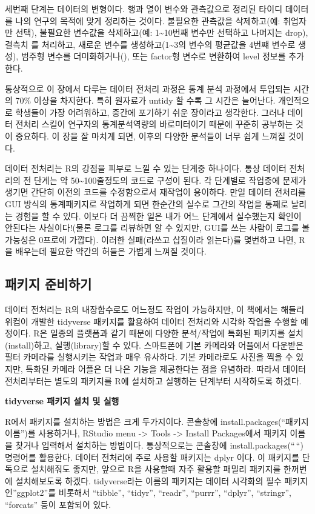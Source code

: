 \documentclass[
]{book}
\begin{document}
세번째 단계는 데이터의 변형이다. 행과 열이 변수와 관측값으로 정리된 타이디 데이터를 나의 연구의 목적에 맞게 정리하는 것이다. 불필요한 관측값을 삭제하고(예: 취업자만 선택), 불필요한 변수값을 삭제하고(예: 1\textasciitilde10번째 변수만 선택하고 나머지는 drop), 결측치 를 처리하고, 새로운 변수를 생성하고(1\textasciitilde3의 변수의 평균값을 4번쨰 변수로 생성), 범주형 변수를 더미화하거나(), 또는 factor형 변수로 변환하여 level 정보를 추가한다.

통상적으로 이 장에서 다루는 데이터 전처리 과정은 통계 분석 과정에서 투입되는 시간의 70\% 이상을 차지한다. 특히 원자료가 untidy 할 수록 그 시간은 늘어난다. 개인적으로 학생들이 가장 어려워하고, 중간에 포기하기 쉬운 장이라고 생각한다. 그러나 데이터 전처리 스킬이 연구자의 통계분석역량의 바로미터이기 때문에 꾸준히 공부하는 것이 중요하다. 이 장을 잘 마치게 되면, 이후의 다양한 분석들이 너무 쉽게 느껴질 것이다.

데이터 전처리는 R의 강점을 피부로 느낄 수 있는 단계중 하나이다. 통상 데이터 전처리의 전 단계는 약 50\textasciitilde100줄정도의 코드로 구성이 된다. 각 단계별로 작업중에 문제가 생기면 간단히 이전의 코드를 수정함으로서 재작업이 용이하다.
만일 데이터 전처리를 GUI 방식의 통계패키지로 작업하게 되면 한순간의 실수로 그간의 작업을 통째로 날리는 경험을 할 수 있다. 이보다 더 끔찍한 일은 내가 어느 단계에서 실수했는지 확인이 안된다는 사실이다!(물론 로그를 리뷰하면 알 수 있지만, GUI를 쓰는 사람이 로그를 볼 가능성은 0프로에 가깝다). 이러한 실패(라쓰고 삽질이라 읽는다)를 몇번하고 나면, R을 배우는데 필요한 약간의 허들은 가볍게 느껴질 것이다.

\subsection{패키지 준비하기}\label{uxd328uxd0a4uxc9c0-uxc900uxbe44uxd558uxae30}

데이터 전처리는 R의 내장함수로도 어느정도 작업이 가능하지만, 이 책에서는 해들리 위컴이 개발한 tidyverse 패키지를 활용하여 데이터 전처리와 시각화 작업을 수행할 예정이다.
R은 일종의 플랫폼과 같기 때문에 다양한 분석/작업에 특화된 패키지를 설치(install)하고, 실행(library)할 수 있다. 스마트폰에 기본 카메라와 어플에서 다운받은 필터 카메라를 실행시키는 작업과 매우 유사하다. 기본 카메라로도 사진을 찍을 수 있지만, 특화된 카메라 어플은 더 나은 기능을 제공한다는 점을 유념하라. 따라서 데이터 전처리부터는 별도의 패키지를 R에 설치하고 실행하는 단계부터 시작하도록 하겠다.

\textbf{tidyverse 패키지 설치 및 실행}

R에서 패키지를 설치하는 방법은 크게 두가지이다. 콘솔창에 install.packages(``패키지 이름'')를 사용하거나, RStudio menu -\textgreater{} Tools -\textgreater{} Install Packages에서 패키지 이름을 찾거나 입력해서 설치하는 방법이다. 통상적으로는 콘솔창에 install.packages(``\,``) 명령어를 활용한다.
데이터 전처리에 주로 사용할 패키지는 dplyr 이다. 이 패키지를 단독으로 설치해줘도 좋지만, 앞으로 R을 사용할때 자주 활용할 패밀리 패키지를 한꺼번에 설치해보도록 하겠다. tidyverse라는 이름의 패키지는 데이터 시각화의 필수 패키지인''ggplot2''를 비롯해서 ``tibble'', ``tidyr'', ``readr'', ``purrr'', ``dplyr'', ``stringr'', ``forcats'' 등이 포함되어 있다.
\end{document}
